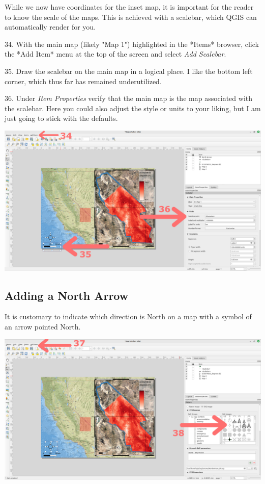 \documentclass[oneside,a4paper,11pt,explicit]{book}
\begin{document}
While we now have coordinates for the inset map, it is important for the reader to know the scale of the maps. This is achieved with a scalebar, which QGIS can automatically render for you.

34. With the main map (likely "Map 1") highlighted in the *Items* browser,  click the *Add Item* menu at the top of the screen and select \textit{Add Scalebar}.

35. Draw the scalebar on the main map in a logical place. I like the bottom left corner, which thus far has remained underutilized. 

36. Under \textit{Item Properties} verify that the main map is the map associated with the scalebar. Here you could also adjust the style or units to your liking, but I am just going to stick with the defaults.

\centerline{\includegraphics[width=\textwidth]{Scalebar.png}}

\clearpage

\subsection{Adding a North Arrow}

It is customary to indicate which direction is North on a map with a symbol of an arrow pointed North. 

\vspace{.25em}

\centerline{\includegraphics[width=\textwidth]{NorthArrow1.png}}
\end{document}
